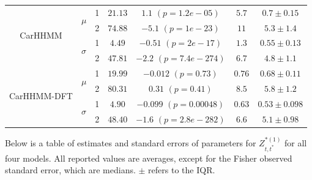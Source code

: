 \documentclass[12pt]{TD-CJS}
\begin{document}
{\begin{tabular}{ccccccc}
\multirow{4}{*}{CarHHMM}    & \multirow{2}{*}{$\mu$}        & 1                             & $21.13$                         & $1.1$ $(p=1.2e-05)$          & $5.7$                             & $0.7 \pm 0.15$                             \\
                            &                               & 2                             & $74.88$                         & $-5.1$ $(p=1e-23)$          & $11$                             & $5.3 \pm 1.4$                             \\
                            & \multirow{2}{*}{$\sigma$}     & 1                             & $4.49$                         & $-0.51$ $(p=2e-17)$          & $1.3$                             & $0.55 \pm 0.13$                             \\
                            &                               & 2                             & $47.81$                         & $-2.2$ $(p=7.4e-274)$          & $6.7$                             & $4.8 \pm 1.1$                             \\ \hline
\multirow{4}{*}{CarHHMM-DFT}& \multirow{2}{*}{$\mu$}        & 1                             & $19.99$                         & $-0.012$ $(p=0.73)$          & $0.76$                             & $0.68 \pm 0.11$                             \\
                            &                               & 2                             & $80.31$                         & $0.31$ $(p=0.41)$          & $8.5$                             & $5.8 \pm 1.2$                             \\
                            & \multirow{2}{*}{$\sigma$}     & 1                             & $4.90$                         & $-0.099$ $(p=0.00048)$          & $0.63$                             & $0.53 \pm 0.098$                             \\
                            &                               & 2                             & $48.40$                         & $-1.6$ $(p=2.8e-282)$          & $6.6$                             & $5.1 \pm 0.98$                             
\end{tabular}
}

\newpage
Below is a table of estimates and standard errors of parameters for $Z^{*(1)}_{t,t^*}$ for all four models. All reported values are averages, except for the Fisher observed standard error, which are medians. $\pm$ refers to the IQR.
\vspace{1cm}
\end{document}
